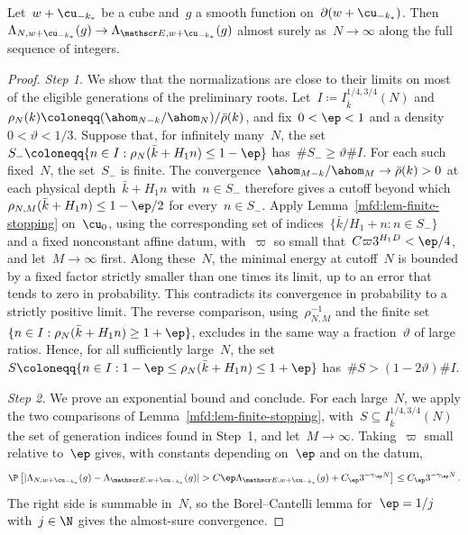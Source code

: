 \documentclass[11pt]{amsart}
\begin{document}
\begin{proposition}
\label{mfd:prop-as-dirichlet}
Let~$w+\cu_{-k_*}$ be a cube and~$g$ a smooth function on~$\partial(w+\cu_{-k_*})$. Then~$\Lambda_{N,w+\cu_{-k_*}}(g)\to\Lambda_{\mathscr E,w+\cu_{-k_*}}(g)$ almost surely as~$N\to\infty$ along the full sequence of integers.
\end{proposition}
\begin{proof}
\emph{Step 1.} We show that the normalizations are close to their limits on most of the eligible generations of the preliminary roots. Let~$I\coloneqq I_{\bar k}^{1/4,3/4}(N)$ and~$\rho_N(k)\coloneqq(\ahom_{N-k}/\ahom_N)/\bar\rho(k)$, and fix~$0<\ep<1$ and a density~$0<\vartheta<1/3$. Suppose that, for infinitely many~$N$, the set~$S_-\coloneqq\{n\in I:\rho_N(\bar k+H_1n)\leq1-\ep\}$ has~$\#S_-\geq\vartheta\#I$. For each such fixed~$N$, the set~$S_-$ is finite. The convergence~$\ahom_{M-k}/\ahom_M\to \bar\rho(k)>0$ at each physical depth~$\bar k+H_1n$ with~$n\in S_-$ therefore gives a cutoff beyond which~$\rho_{N,M}(\bar k+H_1n)\leq1-\ep/2$ for every~$n\in S_-$. Apply Lemma~\ref{mfd:lem-finite-stopping} on~$\cu_0$, using the corresponding set of indices~$\{\bar k/H_1+n:n\in S_-\}$ and a fixed nonconstant affine datum, with~$\varpi$ so small that~$C\varpi3^{H_1D}<\ep/4$, and let~$M\to\infty$ first. Along these~$N$, the minimal energy at cutoff~$N$ is bounded by a fixed factor strictly smaller than one times its limit, up to an error that tends to zero in probability. This contradicts its convergence in probability to a strictly positive limit. The reverse comparison, using~$\rho_{N,M}^{-1}$ and the finite set~$\{n\in I:\rho_N(\bar k+H_1n)\geq1+\ep\}$, excludes in the same way a fraction~$\vartheta$ of large ratios. Hence, for all sufficiently large~$N$, the set~$S\coloneqq\{n\in I:1-\ep\leq \rho_N(\bar k+H_1n)\leq1+\ep\}$ has~$\#S>(1-2\vartheta)\#I$.

\smallskip

\emph{Step 2.} We prove an exponential bound and conclude. For each large~$N$, we apply the two comparisons of Lemma~\ref{mfd:lem-finite-stopping}, with~$S\subseteq I_{\bar k}^{1/4,3/4}(N)$ the set of generation indices found in Step~1, and let~$M\to\infty$. Taking~$\varpi$ small relative to~$\ep$ gives, with constants depending on~$\ep$ and on the datum,
\begin{equation*}
	\P\left[
	|\Lambda_{N,w+\cu_{-k_*}}(g)-\Lambda_{\mathscr E,w+\cu_{-k_*}}(g)|
	>C\ep\Lambda_{\mathscr E,w+\cu_{-k_*}}(g)+C_\ep3^{-\gamma_\ep N}
	\right]\leq C_\ep3^{-\gamma_\ep N}\,.
\end{equation*}
The right side is summable in~$N$, so the Borel--Cantelli lemma for~$\ep=1/j$ with~$j\in\N$ gives the almost-sure convergence.
\end{proof}
\end{document}
